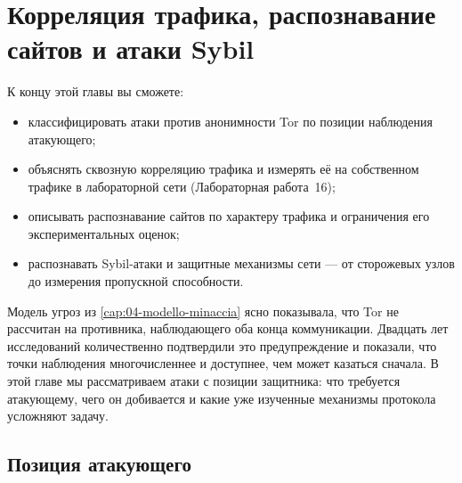 \chapter{Корреляция трафика, распознавание сайтов и атаки Sybil}\label{cap:26-attacchi}

\begin{obiettivi}
К концу этой главы вы сможете:
\begin{itemize}[nosep]
  \item классифицировать атаки против анонимности Tor по позиции наблюдения атакующего;
  \item объяснять сквозную корреляцию трафика и измерять её на собственном трафике в лабораторной сети (Лабораторная работа~16);
  \item описывать распознавание сайтов по характеру трафика и ограничения его экспериментальных оценок;
  \item распознавать Sybil-атаки и защитные механизмы сети — от сторожевых узлов до измерения пропускной способности.
\end{itemize}
\end{obiettivi}

Модель угроз из \cref{cap:04-modello-minaccia} ясно показывала, что Tor не рассчитан на противника, наблюдающего оба конца коммуникации. Двадцать лет исследований количественно подтвердили это предупреждение и показали, что точки наблюдения многочисленнее и доступнее, чем может казаться сначала. В этой главе мы рассматриваем атаки с позиции защитника: что требуется атакующему, чего он добивается и какие уже изученные механизмы протокола усложняют задачу.

\section{Позиция атакующего}\label{sec:att-posizioni}

